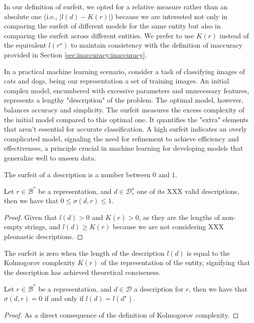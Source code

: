 In our definition of surfeit, we opted for a relative measure rather than an absolute one (i.e., $| l(d) - K(r) |$) because we are interested not only in comparing the surfeit of different models for the same entity but also in comparing the surfeit across different entities. We prefer to use $K(r)$ instead of the equivalent $l \left( r^\star \right)$ to maintain consistency with the definition of inaccuracy provided in Section \ref{sec:inaccuracy:inaccuracy}.

\begin{example}
In a practical machine learning scenario, consider a task of classifying images of cats and dogs, being our representation a set of training images. An initial complex model, encumbered with excessive parameters and unnecessary features, represents a lengthy "description" of the problem. The optimal model, however, balances accuracy and simplicity. The surfeit measures the excess complexity of the initial model compared to this optimal one. It quantifies the "extra" elements that aren't essential for accurate classification. A high surfeit indicates an overly complicated model, signaling the need for refinement to achieve efficiency and effectiveness, a principle crucial in machine learning for developing models that generalize well to unseen data.
\end{example}

The surfeit of a description is a number between $0$ and $1$.

\begin{proposition}
\label{prop:range_redundancy}
Let $r \in \mathcal{B}^\ast$ be a representation, and $d \in \mathcal{D}^\star_r$ one of its {\color{red} XXX valid descriptions}, then we have that $0 \leq \sigma(d, r) \leq 1$.
\end{proposition}
\begin{proof}
Given that $l\left( d \right)>0$ and $K\left( r \right)>0$, as they are the lengths of non-empty strings, and $l\left( d \right) \geq K\left( r \right)$ because we are not considering {\color{red} XXX pleonastic descriptions}.
\end{proof}

The surfeit is zero when the length of the description \(l(d)\) is equal to the Kolmogorov complexity \(K(r)\) of the representation of the entity, signifying that the description has achieved theoretical conciseness.

\begin{proposition}
Let $r \in \mathcal{B}^\ast$ be a representation, and $d \in \mathcal{D}$ a description for $r$, then we have that  $\sigma(d, r) = 0$ if and only if $l(d) = l(d^\star)$.
\end{proposition}
\begin{proof}
As a direct consequence of the definition of Kolmogorov complexity.
\end{proof}

